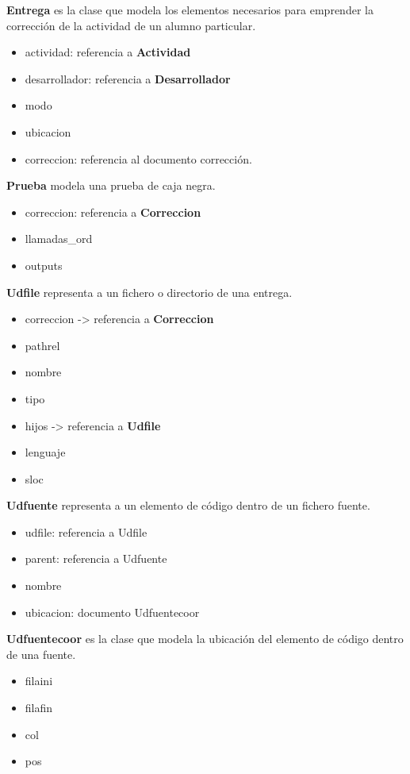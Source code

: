 \textbf{Entrega} es la clase que modela los elementos necesarios para emprender la corrección de la actividad de un alumno particular.
\begin{itemize}
\item actividad: referencia a \textbf{Actividad}
\item desarrollador: referencia a \textbf{Desarrollador}
\item modo
\item ubicacion
\item correccion: referencia al documento corrección.
\end{itemize}


\textbf{Prueba} modela una prueba de caja negra.
\begin{itemize}
\item correccion: referencia a \textbf{Correccion}
\item llamadas\_ord
\item outputs
\end{itemize}


\textbf{Udfile} representa a un fichero o directorio de una entrega.
\begin{itemize}
\item correccion -> referencia a \textbf{Correccion}
\item pathrel
\item nombre
\item tipo
\item hijos -> referencia a \textbf{Udfile}
\item lenguaje
\item sloc
\end{itemize}


\textbf{Udfuente} representa a un elemento de código dentro de un fichero fuente.
\begin{itemize}
\item udfile: referencia a Udfile
\item parent: referencia a Udfuente
\item nombre
\item ubicacion: documento Udfuentecoor
\end{itemize}


\textbf{Udfuentecoor} es la clase que modela la ubicación del elemento de código dentro de una fuente.
\begin{itemize}
\item filaini
\item filafin
\item col
\item pos
\end{itemize}


